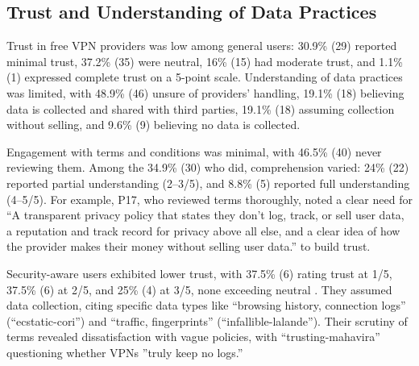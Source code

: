 \documentclass[11pt,a4paper]{article}
\begin{document}
\subsection{Trust and Understanding of Data Practices}
Trust in free VPN providers was low among general users: 30.9\% (29) reported minimal trust, 37.2\% (35) were neutral, 16\% (15) had moderate trust, and 1.1\% (1) expressed complete trust on a 5-point scale. Understanding of data practices was limited, with 48.9\% (46) unsure of providers’ handling, 19.1\% (18) believing data is collected and shared with third parties, 19.1\% (18) assuming collection without selling, and 9.6\% (9) believing no data is collected.

Engagement with terms and conditions was minimal, with 46.5\% (40) never reviewing them. Among the 34.9\% (30) who did, comprehension varied: 24\% (22) reported partial understanding (2--3/5), and 8.8\% (5) reported full understanding (4--5/5). For example, P17, who reviewed terms thoroughly, noted a clear need for ``A transparent privacy policy that states they don't log, track, or sell user data, a reputation and track record for privacy above all else, and a clear idea of how the provider makes their money without selling user data.'' to build trust. 

Security-aware users exhibited lower trust, with 37.5\% (6) rating trust at 1/5, 37.5\% (6) at 2/5, and 25\% (4) at 3/5, none exceeding neutral \citep{Shetty2025}. They assumed data collection, citing specific data types like ``browsing history, connection logs'' (``ecstatic-cori'') and ``traffic, fingerprints'' (``infallible-lalande''). Their scrutiny of terms revealed dissatisfaction with vague policies, with ``trusting-mahavira'' questioning whether VPNs ''truly keep no logs.''
\end{document}

